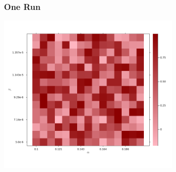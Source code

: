 \documentclass{beamer}
\begin{document}
\begin{frame}\frametitle{One Run}
	\begin{center}
		\includegraphics[width=9cm]{heatmap_profit_gain_gs.png}
	\end{center}
\end{frame}




























	
\end{document}
